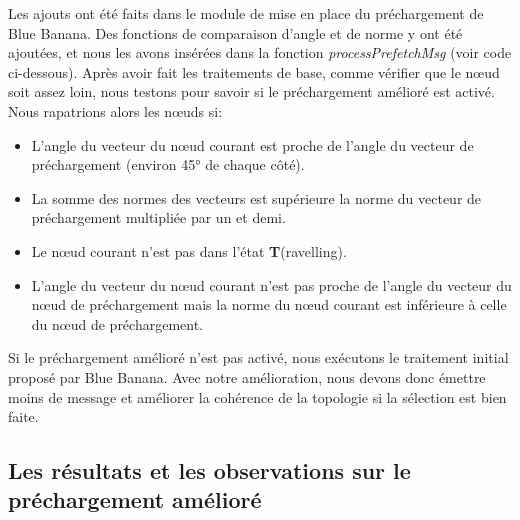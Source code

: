 
\par Les ajouts ont été faits dans le module de mise en place du préchargement de Blue Banana. Des fonctions de comparaison d'angle et de norme y ont été ajoutées, et nous les avons insérées dans la fonction \textit{processPrefetchMsg} (voir code ci-dessous). Après avoir fait les traitements de base, comme vérifier que le nœud soit assez loin, nous testons pour savoir si le préchargement amélioré est activé. 
\newline
\\ Nous rapatrions alors les nœuds si:
        \begin{itemize}
        \renewcommand{\labelitemi}{$\bullet$}
                \item L'angle du vecteur du nœud courant est proche de l'angle du vecteur de préchargement (environ 45° de chaque côté).
		\item La somme des normes des vecteurs est supérieure la norme du vecteur de préchargement multipliée par un et demi. 
                \item Le nœud courant n'est pas dans l'état \textbf{T}(ravelling).
		\item L'angle du vecteur du nœud courant n'est pas proche de l'angle du vecteur du nœud de préchargement mais la norme du nœud courant est inférieure à celle du nœud de préchargement. 
        \end{itemize}
Si le préchargement amélioré n'est pas activé, nous exécutons le traitement initial proposé par Blue Banana. Avec notre amélioration, nous devons donc émettre moins de message et améliorer la cohérence de la topologie si la sélection est bien faite. 

\lstset{numbers=left,basicstyle=\scriptsize, numberstyle=\tiny, stepnumber=5, numbersep=5pt}




\subsection{Les résultats et les observations sur le préchargement amélioré}


